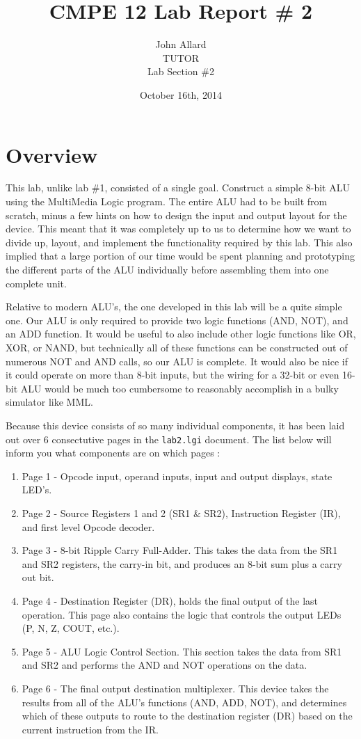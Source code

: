 \documentclass[a4paper,11pt]{article}
\title{ CMPE 12 Lab Report \# 2 \\[7 in]}
\author{John Allard \\ TUTOR \\ Lab Section \#2}
\date{October 16th, 2014}
\begin{document}
\maketitle
\newpage
\tableofcontents
\newpage


\section{Overview}
This lab, unlike lab \#1, consisted of a single goal. Construct a simple 8-bit ALU using the MultiMedia Logic program. The entire ALU had to be built from scratch, minus a few hints on how to design the input and output layout for the device. This meant that it was completely up to us to determine how we want to divide up, layout, and implement the functionality required by this lab. This also implied that a large portion of our time would be spent planning and prototyping the different parts of the ALU individually before assembling them into one complete unit. \par
Relative to modern ALU's, the one developed in this lab will be a quite simple one. Our ALU is only required to provide two logic functions (AND, NOT), and an ADD function. It would be useful to also include other logic functions like OR, XOR, or NAND, but technically all of these functions can be constructed out of numerous NOT and AND calls, so our ALU is complete. It would also be nice if it could operate on more than 8-bit inputs, but the wiring for a 32-bit or even 16-bit ALU would be much too cumbersome to reasonably accomplish in a bulky simulator like MML. \par  Because this device consists of so many individual components, it has been laid out over 6 consectutive pages in the \texttt{lab2.lgi} document. The list below will inform you what components are on which pages :
\begin{enumerate}
\item Page 1 - Opcode input, operand inputs, input and output displays, state LED's.
\item Page 2 - Source Registers 1 and 2 (SR1 \& SR2), Instruction Register (IR), and first level Opcode decoder.
\item Page 3 - 8-bit Ripple Carry Full-Adder. This takes the data from the SR1 and SR2 registers, the carry-in bit, and produces an 8-bit sum plus a carry out bit.
\item Page 4 - Destination Register (DR), holds the final output of the last operation. This page also contains the logic that controls the output LEDs (P, N, Z, COUT, etc.).
\item Page 5 - ALU Logic Control Section. This section takes the data from SR1 and SR2 and performs the AND and NOT operations on the data. 
\item Page 6 - The final output destination multiplexer. This device takes the results from all of the ALU's functions (AND, ADD, NOT), and determines which of these outputs to route to the destination register (DR) based on the current instruction from the IR. 
\end{enumerate}
\end{document}
